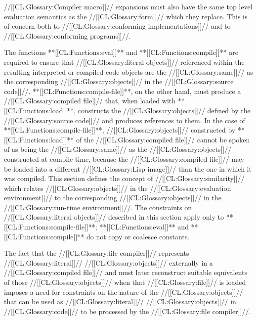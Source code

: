 //[[CL:Glossary:Compiler macro]]// expansions must also have the same top level evaluation semantics as the //[[CL:Glossary:form]]// which they replace. This is of concern both to //[[CL:Glossary:conforming implementations]]// and to //[[CL:Glossary:conforming programs]]//.

\endsubsubsubsection%

\endsubsubsection%

\endsubSection%

 

The functions **[[CL:Functions:eval]]** and **[[CL:Functions:compile]]** are required to ensure that //[[CL:Glossary:literal objects]]// referenced within the resulting interpreted or compiled code objects are the //[[CL:Glossary:same]]// as the corresponding //[[CL:Glossary:objects]]// in the //[[CL:Glossary:source code]]//. **[[CL:Functions:compile-file]]**, on the other hand,  must produce a //[[CL:Glossary:compiled file]]// that, when loaded with **[[CL:Functions:load]]**, constructs the //[[CL:Glossary:objects]]// defined by the //[[CL:Glossary:source code]]// and produces references to them.
  In the case of **[[CL:Functions:compile-file]]**, //[[CL:Glossary:objects]]// constructed by **[[CL:Functions:load]]** of the //[[CL:Glossary:compiled file]]// cannot be spoken of as being the //[[CL:Glossary:same]]// as the //[[CL:Glossary:objects]]// constructed at compile time, because the //[[CL:Glossary:compiled file]]// may be loaded into a different //[[CL:Glossary:Lisp image]]// than the one in which it was compiled.  This section defines the concept of //[[CL:Glossary:similarity]]// which relates //[[CL:Glossary:objects]]// in the //[[CL:Glossary:evaluation environment]]// to the corresponding //[[CL:Glossary:objects]]// in the //[[CL:Glossary:run-time environment]]//.
  The constraints on //[[CL:Glossary:literal objects]]// described in this section apply only to **[[CL:Functions:compile-file]]**; **[[CL:Functions:eval]]** and **[[CL:Functions:compile]]** do not copy or coalesce constants.

 

 The fact that the //[[CL:Glossary:file compiler]]// represents //[[CL:Glossary:literal]]// //[[CL:Glossary:objects]]//  externally in a //[[CL:Glossary:compiled file]]// and must later reconstruct suitable  equivalents of those //[[CL:Glossary:objects]]// when that //[[CL:Glossary:file]]// is loaded imposes a need for constraints on the nature of the //[[CL:Glossary:objects]]// that can be  used as //[[CL:Glossary:literal]]// //[[CL:Glossary:objects]]// in //[[CL:Glossary:code]]// to be processed  by the //[[CL:Glossary:file compiler]]//.

